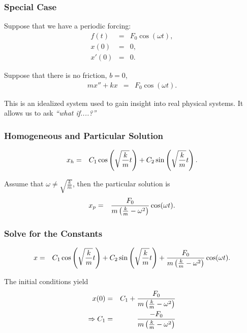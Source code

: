 \begin{frame}
  \frametitle{Special Case}

  Suppose that we have a periodic forcing:
  \begin{eqnarray*}
    f(t) & = & F_0 \cos(\omega t), \\
    x(0) & = & 0, \\
    x'(0) & = & 0.
  \end{eqnarray*}

  Suppose that there is no friction, $b=0$,
  \begin{eqnarray*}
    m x'' + kx & = & F_0 \cos(\omega t).
  \end{eqnarray*}

  This is an idealized system used to gain insight into real physical
  systems. It allows us to ask \textit{``what if....?''}

\end{frame}


\begin{frame}
  \frametitle{Homogeneous and Particular Solution}

  \begin{eqnarray*}
    x_h & = & C_1 \cos\left(\sqrt{\frac{k}{m}}t\right) + C_2 \sin\left(\sqrt{\frac{k}{m}}t\right).
  \end{eqnarray*}

  Assume that $\omega \neq \sqrt{\frac{k}{m}}$, then the particular
  solution is
  \begin{eqnarray*}
    x_p & = & \frac{F_0}{m\left(\frac{k}{m}-\omega^2\right)} \cos(\omega t).
  \end{eqnarray*}


\end{frame}


\begin{frame}
  \frametitle{Solve for the Constants}

  \begin{eqnarray*}
    x & = & C_1 \cos\left(\sqrt{\frac{k}{m}}t\right) + C_2 \sin\left(\sqrt{\frac{k}{m}}t\right)+ 
           \frac{F_0}{m\left(\frac{k}{m}-\omega^2\right)} \cos(\omega t).
  \end{eqnarray*}

  The initial conditions yield
  \begin{eqnarray*}
    x(0) & = & C_1 + \frac{F_0}{m\left(\frac{k}{m}-\omega^2\right)} \\
    \Rightarrow C_1 & = & \frac{-F_0}{m\left(\frac{k}{m}-\omega^2\right)}
  \end{eqnarray*}

\end{frame}


